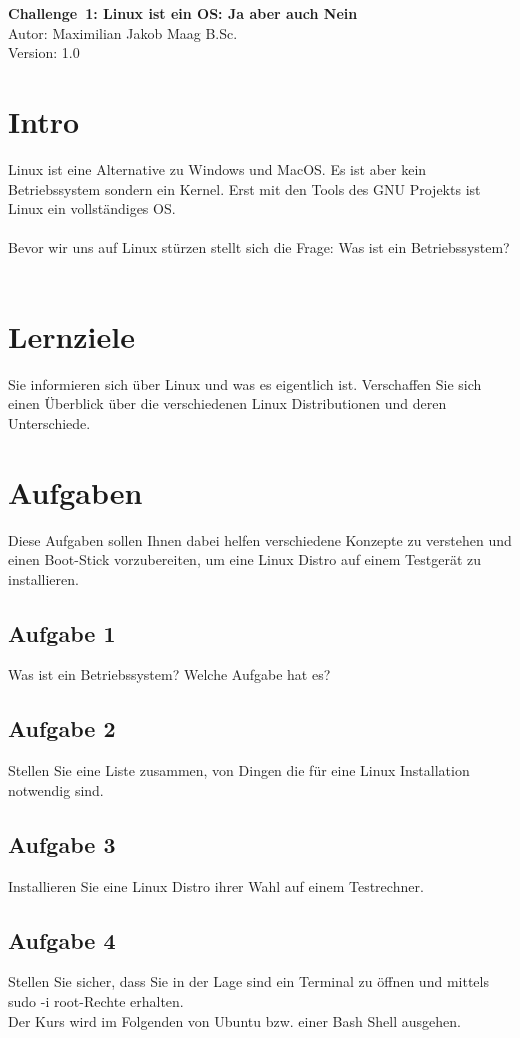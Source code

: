 \documentclass{article}
\begin{document}
    \begin{center}
        \Large \textbf{Challenge 1: Linux ist ein OS: Ja aber auch Nein} \\ [6pt]
        \normalsize
        Autor: Maximilian Jakob Maag B.Sc. \\
        Version: 1.0
    \end{center}

    \section{Intro}
    Linux ist eine Alternative zu Windows und MacOS. Es ist aber kein Betriebssystem sondern ein Kernel.
    Erst mit den Tools des GNU Projekts ist Linux ein vollständiges OS. \\\\
    Bevor wir uns auf Linux stürzen stellt sich die Frage: Was ist ein Betriebssystem? \\\\

    \section{Lernziele}
    Sie informieren sich über Linux und was es eigentlich ist.
    Verschaffen Sie sich einen Überblick über die verschiedenen Linux Distributionen und deren Unterschiede.

    \section{Aufgaben}
    Diese Aufgaben sollen Ihnen dabei helfen verschiedene Konzepte zu verstehen und einen Boot-Stick vorzubereiten, um eine Linux Distro auf einem Testgerät zu installieren.

    \subsection{Aufgabe 1}
    Was ist ein Betriebssystem? Welche Aufgabe hat es?

    \subsection{Aufgabe 2}
    Stellen Sie eine Liste zusammen, von Dingen die für eine Linux Installation notwendig sind.

    \subsection{Aufgabe 3}
    Installieren Sie eine Linux Distro ihrer Wahl auf einem Testrechner.

    \subsection{Aufgabe 4}
    Stellen Sie sicher, dass Sie in der Lage sind ein Terminal zu öffnen und mittels sudo -i root-Rechte erhalten. \\
    Der Kurs wird im Folgenden von Ubuntu bzw. einer Bash Shell ausgehen.
\end{document}
